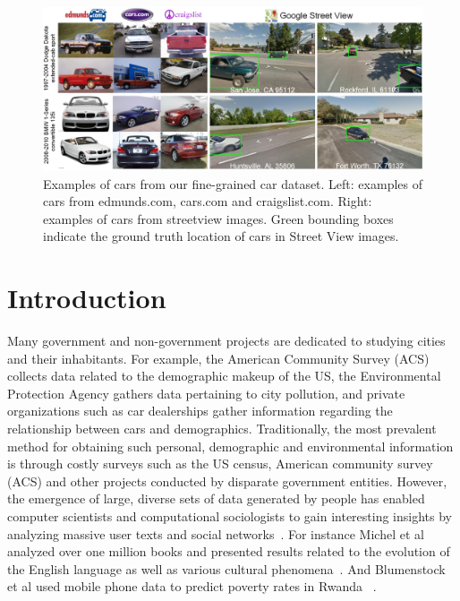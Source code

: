 \documentclass[letterpaper]{article}
\begin{document}
\begin{figure}[t]
\begin{center}
   \includegraphics[width=1\linewidth]{img/dataset_figure.png}
\end{center}
   \caption{ Examples of cars from our fine-grained car dataset. Left: examples of cars from edmunds.com, cars.com and craigslist.com. Right: examples of cars from streetview images. Green bounding boxes indicate the ground truth location of cars in Street View images.}
\label{fig:dataset1}
\end{figure}
\section{Introduction}

Many government and non-government projects are dedicated to studying cities and their inhabitants. For example, the American Community Survey (ACS) collects data related to the demographic makeup of the US, the Environmental Protection Agency gathers data pertaining to city pollution, and private organizations such as car dealerships gather information regarding the relationship between cars and demographics. Traditionally, the most prevalent method for obtaining such personal, demographic and environmental information is through costly surveys such as the US census, American community survey (ACS) and other projects conducted by disparate government entities. However, the emergence of large, diverse sets of data generated by people has enabled computer scientists and computational sociologists to gain interesting insights by analyzing massive user texts and social networks~\cite{jure,nlp_people}. For instance Michel et al analyzed over one million books and presented results related to the evolution of the English language as well as various cultural phenomena~\cite{ngrams}.  And  Blumenstock et al used mobile phone data to predict poverty rates in Rwanda ~\cite{mobile}.
\end{document}
